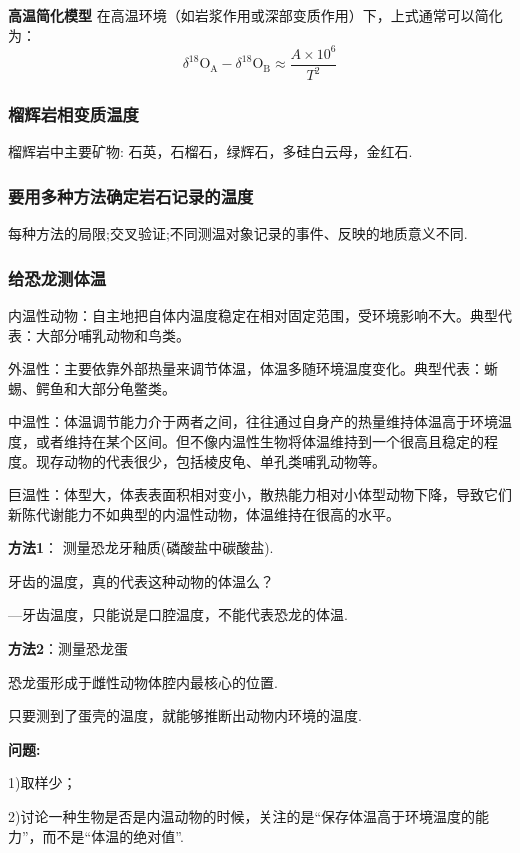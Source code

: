 \documentclass[12pt,a4paper]{article}
\begin{document}
	\textbf{高温简化模型}
	在高温环境（如岩浆作用或深部变质作用）下，上式通常可以简化为：
	\begin{equation}
		\delta ^{18}\text{O}_{\text{A}} - \delta ^{18}\text{O}_{\text{B}} \approx \frac{A \times 10^6}{T^2}
	\end{equation}
	\subsubsection{榴辉岩相变质温度}
	
	榴辉岩中主要矿物: 石英，石榴石，绿辉石，多硅白云母，金红石.
	
	\subsubsection{要用多种方法确定岩石记录的温度}
	
	每种方法的局限;交叉验证;不同测温对象记录的事件、反映的地质意义不同.
	
	\subsubsection{给恐龙测体温}
	
	内温性动物：自主地把自体内温度稳定在相对固定范围，受环境影响不大。典型代表：大部分哺乳动物和鸟类。
	
	外温性：主要依靠外部热量来调节体温，体温多随环境温度变化。典型代表：蜥蜴、鳄鱼和大部分龟鳖类。
	
	中温性：体温调节能力介于两者之间，往往通过自身产的热量维持体温高于环境温度，或者维持在某个区间。但不像内温性生物将体温维持到一个很高且稳定的程度。现存动物的代表很少，包括棱皮龟、单孔类哺乳动物等。
	
	巨温性：体型大，体表表面积相对变小，散热能力相对小体型动物下降，导致它们新陈代谢能力不如典型的内温性动物，体温维持在很高的水平。
	
	\textbf{方法1}： 测量恐龙牙釉质(磷酸盐中碳酸盐).
	
	牙齿的温度，真的代表这种动物的体温么？
	
	---牙齿温度，只能说是口腔温度，不能代表恐龙的体温.
	
	\textbf{方法2}：测量恐龙蛋
	
	恐龙蛋形成于雌性动物体腔内最核心的位置.
	
	只要测到了蛋壳的温度，就能够推断出动物内环境的温度.
	
	\textbf{问题:}
	
	1)取样少；
	
	2)讨论一种生物是否是内温动物的时候，关注的是“保存体温高于环境温度的能力”，而不是“体温的绝对值”.
	
\end{document}
